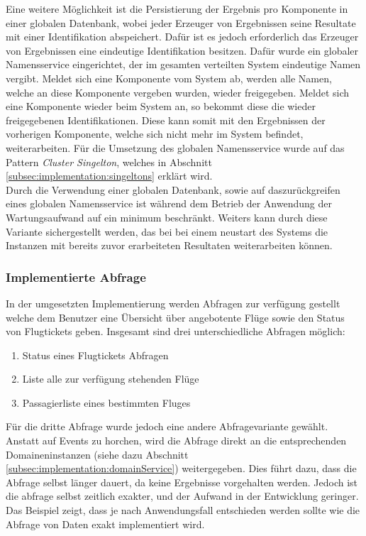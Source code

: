 Eine weitere Möglichkeit ist die Persistierung der Ergebnis pro Komponente in einer globalen Datenbank, wobei jeder Erzeuger von Ergebnissen seine Resultate mit einer Identifikation abspeichert. Dafür ist es jedoch erforderlich das Erzeuger von Ergebnissen eine eindeutige Identifikation besitzen. Dafür wurde ein globaler Namensservice eingerichtet, der im gesamten verteilten System eindeutige Namen vergibt. Meldet sich eine Komponente vom System ab, werden alle Namen, welche an diese Komponente vergeben wurden, wieder freigegeben. Meldet sich eine Komponente wieder beim System an, so bekommt diese die wieder freigegebenen Identifikationen. Diese kann somit mit den Ergebnissen der vorherigen Komponente, welche sich nicht  mehr im System befindet, weiterarbeiten. Für die Umsetzung des globalen Namensservice wurde auf das Pattern \textit{Cluster Singelton}, welches in Abschnitt \ref{subsec:implementation:singeltons} erklärt wird. \\
Durch die Verwendung einer globalen Datenbank, sowie auf daszurückgreifen eines globalen Namensservice ist während dem Betrieb der Anwendung der Wartungsaufwand auf ein minimum beschränkt. Weiters kann durch diese Variante sichergestellt werden, das bei bei einem neustart des Systems die Instanzen mit bereits zuvor erarbeiteten Resultaten weiterarbeiten können. 

\subsubsection{Implementierte Abfrage}
In der umgesetzten Implementierung werden Abfragen zur verfügung gestellt welche dem Benutzer eine Übersicht über angebotente Flüge sowie den Status von Flugtickets geben. Insgesamt sind drei unterschiedliche Abfragen möglich:

\begin{enumerate}
    \item Status eines Flugtickets Abfragen
    \item Liste alle zur verfügung stehenden Flüge
    \item Passagierliste eines bestimmten Fluges
\end{enumerate}

Für die dritte Abfrage wurde jedoch eine andere Abfragevariante gewählt. Anstatt auf Events zu horchen, wird die Abfrage direkt an die entsprechenden Domaineninstanzen (siehe dazu Abschnitt \ref{subsec:implementation:domainService}) weitergegeben. Dies führt dazu, dass die Abfrage selbst länger dauert, da keine Ergebnisse vorgehalten werden. Jedoch ist die abfrage selbst zeitlich exakter, und der Aufwand in der Entwicklung geringer. \\
Das Beispiel zeigt, dass je nach Anwendungsfall entschieden werden sollte wie die Abfrage von Daten exakt implementiert wird.

